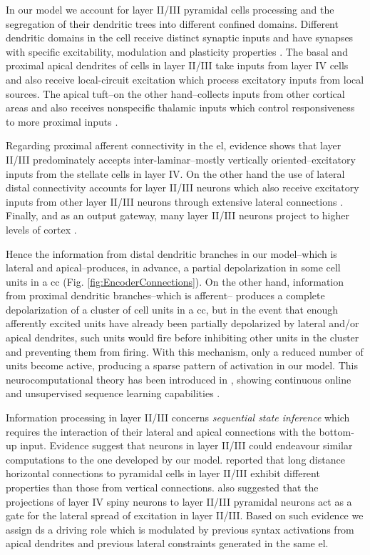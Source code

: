 {In our model we account for layer II/III pyramidal cells processing and the segregation of their dendritic trees into different confined domains.
Different dendritic domains in the cell receive distinct synaptic inputs and have synapses with specific excitability, modulation and plasticity properties \cite{Spruston2008PyramidalND}.
The basal and proximal apical dendrites of cells in layer II/III take inputs from layer IV cells and also receive local-circuit excitation
which process excitatory inputs from local sources.
The apical tuft--on the other hand--collects inputs from other cortical areas and also receives nonspecific thalamic inputs
which control responsiveness to more proximal inputs \cite{10.1093/cercor/bhh065}.

Regarding proximal afferent connectivity in the \gls{el}, evidence shows that layer II/III predominately accepts inter-laminar--mostly vertically oriented--excitatory inputs from the stellate cells in layer IV. On the other hand the use of lateral distal connectivity accounts for layer II/III neurons which also receive excitatory inputs from other layer II/III neurons through extensive lateral connections \cite{BANNISTER200595}. Finally, and as an output gateway, many layer II/III neurons project to higher levels of cortex \cite{THOMSON1998669}.

Hence the information from distal dendritic branches in our model--which is lateral and apical--produces, in advance, a partial depolarization in some cell units in a \gls{cc}  (Fig. \ref{fig:EncoderConnections}). On the other hand, information from proximal dendritic branches--which is afferent-- produces a complete depolarization of a cluster of cell units in a \gls{cc}, but in the event that enough afferently excited units have already been partially depolarized by lateral and/or apical dendrites, such units would fire before inhibiting other units in the cluster and preventing them from firing. With this mechanism, only a reduced number of units become active, producing a sparse pattern of activation in our model. This neurocomputational theory has been introduced in \cite{10.3389/fncir.2016.00023}, showing continuous online and unsupervised sequence learning capabilities \cite{Cui:2016:COS:3030654.3030660}.

Information processing in layer II/III concerns \emph{sequential state inference} which requires the interaction of their lateral and apical connections with the bottom-up input. Evidence suggest that neurons in layer II/III could endeavour similar computations to the one developed by our model. \cite{Yoshimura1931} reported that long distance horizontal connections to pyramidal cells in layer II/III exhibit different properties than those from vertical connections.
\cite{doi:10.1113/jphysiol.2001.012959} also suggested that the projections of layer IV spiny neurons to layer II/III pyramidal neurons act as a gate for the lateral spread of excitation in layer II/III. Based on such evidence we assign \gls{ds} a driving role which is modulated by previous syntax activations from apical dendrites and previous lateral constraints generated in the same \gls{el}.

}
